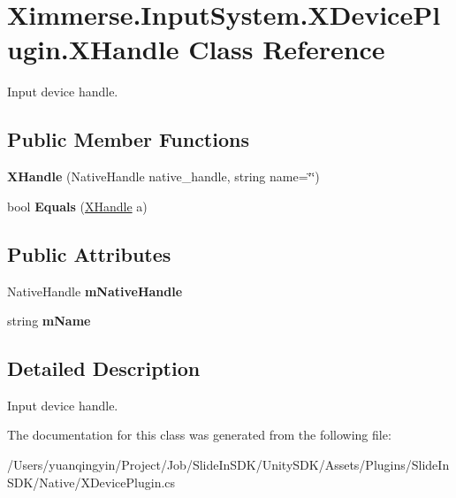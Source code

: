 \hypertarget{class_ximmerse_1_1_input_system_1_1_x_device_plugin_1_1_x_handle}{}\section{Ximmerse.\+Input\+System.\+X\+Device\+Plugin.\+X\+Handle Class Reference}
\label{class_ximmerse_1_1_input_system_1_1_x_device_plugin_1_1_x_handle}


Input device handle.  


\subsection*{Public Member Functions}
\begin{DoxyCompactItemize}
\item 
\mbox{\label{class_ximmerse_1_1_input_system_1_1_x_device_plugin_1_1_x_handle_aa0129522a16087a53837a3e192e5fcf2}} 
{\bfseries X\+Handle} (Native\+Handle native\+\_\+handle, string name=\char`\"{}\char`\"{})
\item 
\mbox{\label{class_ximmerse_1_1_input_system_1_1_x_device_plugin_1_1_x_handle_a6a651a22275ce87e3814bdae97776bf6}} 
bool {\bfseries Equals} (\mbox{\hyperlink{class_ximmerse_1_1_input_system_1_1_x_device_plugin_1_1_x_handle}{X\+Handle}} a)
\end{DoxyCompactItemize}
\subsection*{Public Attributes}
\begin{DoxyCompactItemize}
\item 
\mbox{\label{class_ximmerse_1_1_input_system_1_1_x_device_plugin_1_1_x_handle_adde75c9613153f41b45d9b92c6933691}} 
Native\+Handle {\bfseries m\+Native\+Handle}
\item 
\mbox{\label{class_ximmerse_1_1_input_system_1_1_x_device_plugin_1_1_x_handle_a873a679236bea2cc751419fb421f3c6e}} 
string {\bfseries m\+Name}
\end{DoxyCompactItemize}


\subsection{Detailed Description}
Input device handle. 

The documentation for this class was generated from the following file\+:\begin{DoxyCompactItemize}
\item 
/\+Users/yuanqingyin/\+Project/\+Job/\+Slide\+In\+S\+D\+K/\+Unity\+S\+D\+K/\+Assets/\+Plugins/\+Slide\+In\+S\+D\+K/\+Native/X\+Device\+Plugin.\+cs\end{DoxyCompactItemize}
